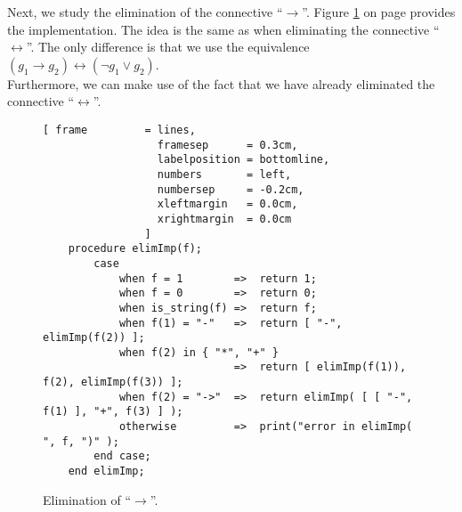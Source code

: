 Next, we study the elimination of the connective  ``$\rightarrow$''. 
Figure \ref{fig:eliminate-folgt} on page \pageref{fig:eliminate-folgt} provides the implementation.
The idea is the same as when eliminating the connective ``$\leftrightarrow$''.  
The only difference is  that we use the equivalence
 \\[0.2cm]
\hspace*{1.3cm} $(g_1 \rightarrow g_2) \leftrightarrow (\neg g_1 \vee g_2)$. \\[0.2cm]
Furthermore, we can make use of the fact that we have already eliminated the connective  ``$\leftrightarrow$''.


\begin{figure}[!ht]
  \centering
\begin{Verbatim}[ frame         = lines, 
                  framesep      = 0.3cm, 
                  labelposition = bottomline,
                  numbers       = left,
                  numbersep     = -0.2cm,
                  xleftmargin   = 0.0cm,
                  xrightmargin  = 0.0cm
                ]
    procedure elimImp(f);
        case
            when f = 1        =>  return 1;
            when f = 0        =>  return 0;
            when is_string(f) =>  return f;
            when f(1) = "-"   =>  return [ "-", elimImp(f(2)) ];
            when f(2) in { "*", "+" } 
                              =>  return [ elimImp(f(1)), f(2), elimImp(f(3)) ];
            when f(2) = "->"  =>  return elimImp( [ [ "-", f(1) ], "+", f(3) ] );
            otherwise         =>  print("error in elimImp( ", f, ")" );
        end case;
    end elimImp;
\end{Verbatim}
\vspace*{-0.3cm}
  \caption{Elimination of ``$\rightarrow$''.}
  \label{fig:eliminate-folgt}
\end{figure}
 
